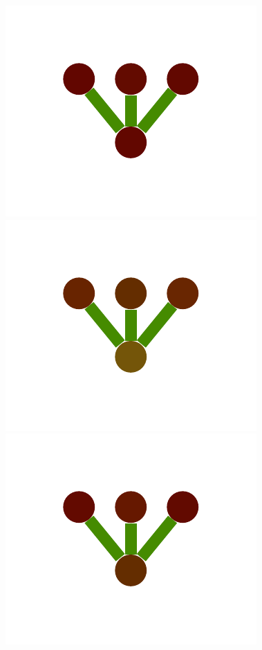 \documentclass[a4paper,10pt]{article}
\begin{document}
\begin{figure}
{    \includegraphics[scale=.2]{../figures/vector/6-1-single-color-flower-data-6.pdf}
    \includegraphics[scale=.2]{../figures/vector/6-1-single-color-flower-data-7.pdf}
    \includegraphics[scale=.2]{../figures/vector/6-1-single-color-flower-data-8.pdf}
    \label{fig:exp-single-flower-data}
    }

\end{figure}
\end{document}
